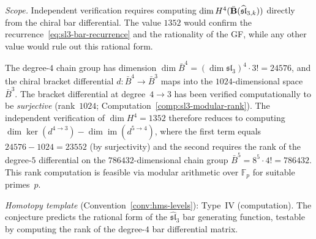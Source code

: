 \begin{conjecture}
\emph{Scope.}  Independent verification requires computing $\dim H^4(\bar{\mathbf{B}}(\widehat{\mathfrak{sl}}_{3,k}))$ directly from the chiral bar differential.  The value $1352$ would confirm the recurrence~\eqref{eq:sl3-bar-recurrence} and the rationality of the GF, while any other value would rule out this rational form.

The degree-$4$ chain group has dimension $\dim \bar{B}^4 = (\dim\mathfrak{sl}_3)^4 \cdot 3! = 24576$, and the chiral bracket differential $d\colon \bar{B}^4 \to \bar{B}^3$ maps into the $1024$-dimensional space $\bar{B}^3$.  The bracket differential at degree~$4 \to 3$ has been verified computationally to be \emph{surjective} (rank~$1024$; Computation~\ref{comp:sl3-modular-rank}).  The independent verification of $\dim H^4 = 1352$ therefore reduces to computing $\dim\ker(d^{4 \to 3}) - \dim\operatorname{im}(d^{5 \to 4})$, where the first term equals $24576 - 1024 = 23552$ (by surjectivity) and the second requires the rank of the degree-$5$ differential on the $786432$-dimensional chain group $\bar{B}^5 = 8^5 \cdot 4! = 786432$.  This rank computation is feasible via modular arithmetic over $\mathbb{F}_p$ for suitable primes~$p$.
\end{conjecture}

\begin{remark}[Scope]
\emph{Homotopy template} (Convention~\ref{conv:hms-levels}): Type~IV (computation).
The conjecture predicts the rational form of the $\widehat{\mathfrak{sl}}_3$ bar generating function, testable by computing the rank of the degree-$4$ bar differential matrix.
\end{remark}

